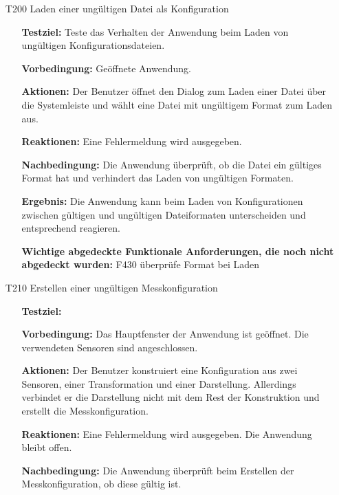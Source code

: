 \documentclass[parskip=full]{scrartcl}
\begin{document}
\begin{itemize} 

\item[T200] Laden einer ungültigen Datei als Konfiguration
\begin{itemize}

\item []\textbf{Testziel:} Teste das Verhalten der Anwendung beim Laden von ungültigen Konfigurationsdateien.

\item []\textbf{Vorbedingung:} Geöffnete Anwendung.
\item []\textbf{Aktionen:} Der Benutzer öffnet den Dialog zum Laden einer Datei über die Systemleiste und wählt eine Datei mit ungültigem Format zum Laden aus.
\item []\textbf{Reaktionen:} Eine Fehlermeldung wird ausgegeben.
\item []\textbf{Nachbedingung:} Die Anwendung überprüft, ob die Datei ein gültiges Format hat und verhindert das Laden von ungültigen Formaten. 


\item []\textbf{Ergebnis:} Die Anwendung kann beim Laden von Konfigurationen zwischen gültigen und ungültigen Dateiformaten unterscheiden und entsprechend reagieren.
\item []\textbf{Wichtige abgedeckte Funktionale Anforderungen, die noch nicht abgedeckt wurden:} F430 überprüfe Format bei Laden

\end{itemize}

\item[T210] Erstellen einer ungültigen Messkonfiguration
\begin{itemize}

\item []\textbf{Testziel:} 

\item []\textbf{Vorbedingung:} Das Hauptfenster der Anwendung ist geöffnet. Die verwendeten Sensoren sind angeschlossen.

\item []\textbf{Aktionen:} Der Benutzer konstruiert eine Konfiguration aus zwei Sensoren, einer Transformation und einer Darstellung. Allerdings verbindet er die Darstellung nicht mit dem Rest der Konstruktion und erstellt die Messkonfiguration.
\item []\textbf{Reaktionen:} Eine Fehlermeldung wird ausgegeben. Die Anwendung bleibt offen.
\item []\textbf{Nachbedingung:} Die Anwendung überprüft beim Erstellen der Messkonfiguration, ob diese gültig ist.


\end{itemize}
\end{itemize}
\end{document}
